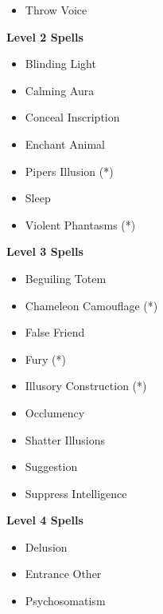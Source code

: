 \begin{multicols}{4}
{\begin{itemize}[itemsep=0em]
\item Throw Voice


\end{itemize}
\textbf{Level 2 Spells}
\begin{itemize}[itemsep=0em]
\renewcommand\labelitemi{-}
\item Blinding Light

\item Calming Aura

\item Conceal Inscription

\item Enchant Animal

\item Piper{\apos}s Illusion (*) 

\item Sleep

\item Violent Phantasms (*) 


\end{itemize}
\textbf{Level 3 Spells}
\begin{itemize}[itemsep=0em]
\renewcommand\labelitemi{-}
\item Beguiling Totem

\item Chameleon\apos{} Camouflage (*) 

\item False Friend

\item Fury (*) 

\item Illusory Construction (*) 

\item Occlumency

\item Shatter Illusions

\item Suggestion

\item Suppress Intelligence


\end{itemize}
\textbf{Level 4 Spells}
\begin{itemize}[itemsep=0em]
\renewcommand\labelitemi{-}
\item Delusion

\item Entrance Other

\item Psychosomatism


\end{itemize}}
\end{multicols}

